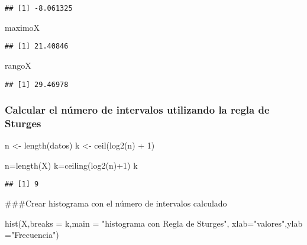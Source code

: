 \documentclass[
]{article}
\newenvironment{Shaded}{\begin{snugshade}}{\end{snugshade}}
\newcommand{\AttributeTok}[1]{\textcolor[rgb]{0.77,0.63,0.00}{#1}}
\newcommand{\DecValTok}[1]{\textcolor[rgb]{0.00,0.00,0.81}{#1}}
\newcommand{\FunctionTok}[1]{\textcolor[rgb]{0.00,0.00,0.00}{#1}}
\newcommand{\NormalTok}[1]{#1}
\newcommand{\OtherTok}[1]{\textcolor[rgb]{0.56,0.35,0.01}{#1}}
\newcommand{\SpecialCharTok}[1]{\textcolor[rgb]{0.00,0.00,0.00}{#1}}
\newcommand{\StringTok}[1]{\textcolor[rgb]{0.31,0.60,0.02}{#1}}
\begin{document}
\begin{verbatim}
## [1] -8.061325
\end{verbatim}

\begin{Shaded}
\begin{Highlighting}[]
\NormalTok{maximoX}
\end{Highlighting}
\end{Shaded}

\begin{verbatim}
## [1] 21.40846
\end{verbatim}

\begin{Shaded}
\begin{Highlighting}[]
\NormalTok{rangoX}
\end{Highlighting}
\end{Shaded}

\begin{verbatim}
## [1] 29.46978
\end{verbatim}

\hypertarget{calcular-el-nuxfamero-de-intervalos-utilizando-la-regla-de-sturges}{%
\subsubsection{Calcular el número de intervalos utilizando la regla de
Sturges}\label{calcular-el-nuxfamero-de-intervalos-utilizando-la-regla-de-sturges}}

n \textless- length(datos) k \textless- ceil(log2(n) + 1)

\begin{Shaded}
\begin{Highlighting}[]
\NormalTok{n}\OtherTok{=}\FunctionTok{length}\NormalTok{(X)}
\NormalTok{k}\OtherTok{=}\FunctionTok{ceiling}\NormalTok{(}\FunctionTok{log2}\NormalTok{(n)}\SpecialCharTok{+}\DecValTok{1}\NormalTok{)}
\NormalTok{k}
\end{Highlighting}
\end{Shaded}

\begin{verbatim}
## [1] 9
\end{verbatim}

\#\#\#Crear histograma con el número de intervalos calculado

\begin{Shaded}
\begin{Highlighting}[]
\FunctionTok{hist}\NormalTok{(X,}\AttributeTok{breaks =}\NormalTok{ k,}\AttributeTok{main =} \StringTok{"histograma con Regla de Sturges"}\NormalTok{,}
     \AttributeTok{xlab=}\StringTok{"valores"}\NormalTok{,}\AttributeTok{ylab =}\StringTok{"Frecuencia"}\NormalTok{)}
\end{Highlighting}
\end{Shaded}
\end{document}
